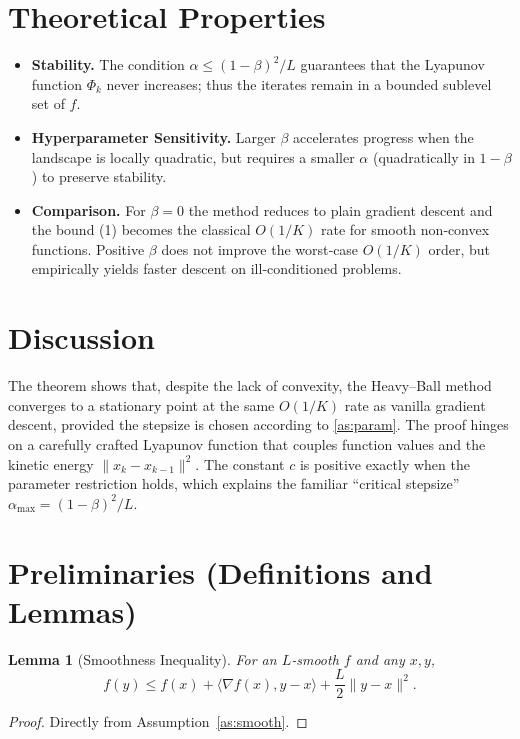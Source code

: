 \documentclass{article}
\newtheorem{lemma}{Lemma}
\newcommand{\grad}{\nabla}
\begin{document}
\section*{Theoretical Properties}
\begin{itemize}
\item \textbf{Stability.} The condition $\alpha\le(1-\beta)^2/L$ guarantees that the Lyapunov function $\Phi_k$ never increases; thus the iterates remain in a bounded sublevel set of $f$.
\item \textbf{Hyperparameter Sensitivity.} Larger $\beta$ accelerates progress when the landscape is locally quadratic, but requires a smaller $\alpha$ (quadratically in $1-\beta$) to preserve stability.
\item \textbf{Comparison.} For $\beta=0$ the method reduces to plain gradient descent and the bound (1) becomes the classical $O(1/K)$ rate for smooth non‑convex functions. Positive $\beta$ does not improve the worst‑case $O(1/K)$ order, but empirically yields faster descent on ill‑conditioned problems.
\end{itemize}

\section*{Discussion}
The theorem shows that, despite the lack of convexity, the Heavy–Ball method converges to a stationary point at the same $O(1/K)$ rate as vanilla gradient descent, provided the stepsize is chosen according to \ref{as:param}. The proof hinges on a carefully crafted Lyapunov function that couples function values and the kinetic energy $\|x_k-x_{k-1}\|^2$. The constant $c$ is positive exactly when the parameter restriction holds, which explains the familiar ``critical stepsize'' $\alpha_{\max}=(1-\beta)^2/L$.

\section*{Preliminaries (Definitions and Lemmas)}
\begin{lemma}[Smoothness Inequality]\label{lem:smooth}
For an $L$‑smooth $f$ and any $x,y$,
\[
f(y)\le f(x)+\langle\grad f(x),y-x\rangle+\frac{L}{2}\|y-x\|^2 .
\tag{L1}
\]
\end{lemma}
\begin{proof}
Directly from Assumption~\ref{as:smooth}. \hfill\qedhere
\end{proof}
\end{document}
